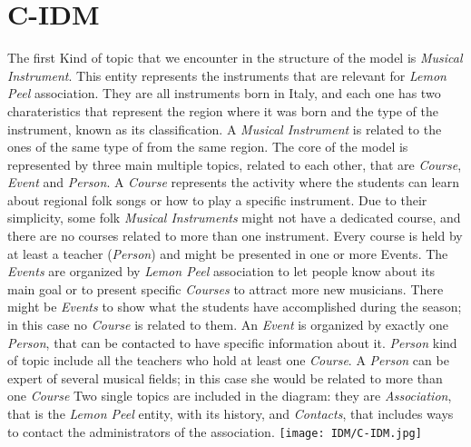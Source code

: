 \documentclass[../../DD.tex]{subfiles}
\begin{document}
\section{C-IDM \label{sect:2.1}}
	The first Kind of topic that we encounter in the structure of the model is \textit{Musical Instrument}. This entity represents the instruments that are relevant for \textit{Lemon Peel} association. They are all instruments born in Italy, and each one has two charateristics that represent the region where it was born and the type of the instrument, known as its classification. A \textit{Musical Instrument} is related to the ones of the same type of from the same region.
	\newline
	The core of the model is represented by three main multiple topics, related to each other, that are \textit{Course}, \textit{Event} and \textit{Person}. A \textit{Course} represents the activity where the students can learn about regional folk songs or how to play a specific instrument. Due to their simplicity, some folk \textit{Musical Instruments} might not have a dedicated course, and there are no courses related to more than one instrument. Every course is held by at least a teacher (\textit{Person}) and might be presented in one or more Events.
	\newline
	The \textit{Events} are organized by \textit{Lemon Peel} association to let people know about its main goal or to present specific \textit{Courses} to attract more new musicians. There might be \textit{Events} to show what the students have accomplished during the season; in this case no \textit{Course} is related to them. An \textit{Event} is organized by exactly one \textit{Person}, that can be contacted to have specific information about it. 
	\newline
	\textit{Person} kind of topic include all the teachers who hold at least one \textit{Course}. A \textit{Person} can be expert of several musical fields; in this case she would be related to more than one \textit{Course}
	\newline
	Two single topics are included in the diagram: they are \textit{Association}, that is the \textit{Lemon Peel} entity, with its history, and \textit{Contacts}, that includes ways to contact the administrators of the association.
	\newline
	\texttt{[image: IDM/C-IDM.jpg]}
\end{document}
